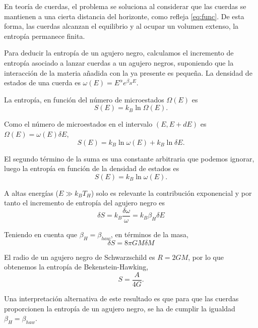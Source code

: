 En teoría de cuerdas, el problema se soluciona al considerar que las cuerdas se mantienen a
una cierta distancia del horizonte, como refleja \ref{eq:func}.
De esta forma, las cuerdas alcanzan el equilibrio y al ocupar un volumen extenso, la entropía
permanece finita.

Para deducir la entropía de un agujero negro, calculamos el incremento de entropía asociado 
a lanzar cuerdas a un agujero negros, suponiendo que la interacción de la materia añadida con la
ya presente es pequeña. 
La densidad de estados de una cuerda es
$\omega(E) = E^\alpha e^{\beta_H E}$.

La entropía, en función del número de microestados $\Omega(E)$ es 
\begin{equation}
  S(E) = k_B\ln\Omega(E).
\end{equation}

Como el número de microestados en el intervalo $(E,E+dE)$ es $\Omega(E) = \omega(E)\delta E$,
\begin{equation}
  S(E) = k_B \ln \omega(E) + k_B \ln \delta E.
\end{equation}

El segundo término de la suma es una constante arbitraria que podemos ignorar, luego
la entropía en función de la densidad de estados es
\begin{equation}
  S(E) = k_B \ln \omega(E).
\end{equation}

A altas energías ($E \gg k_B T_H$) solo es relevante la contribución exponencial y por 
tanto el incremento de entropía del agujero negro es
\begin{equation}
  \delta S = k_B  \frac{\delta \omega}{\omega} = k_B \beta_H \delta E
\end{equation}

Teniendo en cuenta que $\beta_H = \beta_{haw}$, en términos de la masa,
\begin{equation}
  \delta S =  8\pi GM\delta M
\end{equation}

El radio de un agujero negro de Schwarzschild es $R=2GM$, por lo que obtenemos la entropía
de Bekenstein-Hawking,
\begin{equation}
  S=\frac{A}{4G}.
\end{equation}

Una interpretación alternativa de este resultado es que para que las cuerdas proporcionen
la entropía de un agujero negro, se ha de cumplir la igualdad $\beta_H = \beta_{haw}$.
